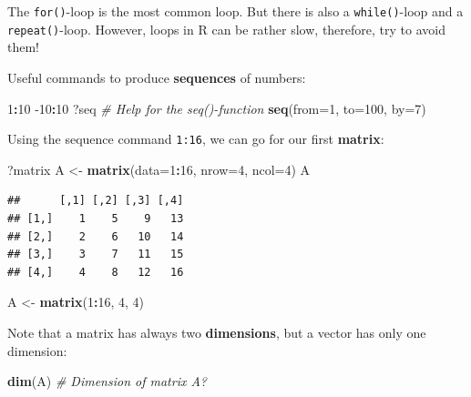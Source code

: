 \documentclass[]{book}
\newenvironment{Shaded}{\begin{snugshade}}{\end{snugshade}}
\newcommand{\CommentTok}[1]{\textcolor[rgb]{0.56,0.35,0.01}{\textit{#1}}}
\newcommand{\DataTypeTok}[1]{\textcolor[rgb]{0.13,0.29,0.53}{#1}}
\newcommand{\DecValTok}[1]{\textcolor[rgb]{0.00,0.00,0.81}{#1}}
\newcommand{\KeywordTok}[1]{\textcolor[rgb]{0.13,0.29,0.53}{\textbf{#1}}}
\newcommand{\NormalTok}[1]{#1}
\newcommand{\OperatorTok}[1]{\textcolor[rgb]{0.81,0.36,0.00}{\textbf{#1}}}
\newcommand{\StringTok}[1]{\textcolor[rgb]{0.31,0.60,0.02}{#1}}
\theoremstyle{definition}
\theoremstyle{definition}
\theoremstyle{definition}
\theoremstyle{remark}
\begin{document}
The \texttt{for()}-loop is the most common loop. But there is also a \texttt{while()}-loop and a \texttt{repeat()}-loop. However, loops in R can be rather slow, therefore, try to avoid them!

Useful commands to produce \textbf{sequences} of numbers:

\begin{Shaded}
\begin{Highlighting}[]
\DecValTok{1}\OperatorTok{:}\DecValTok{10}
\DecValTok{-10}\OperatorTok{:}\DecValTok{10}
\NormalTok{?seq }\CommentTok{# Help for the seq()-function}
\KeywordTok{seq}\NormalTok{(}\DataTypeTok{from=}\DecValTok{1}\NormalTok{, }\DataTypeTok{to=}\DecValTok{100}\NormalTok{, }\DataTypeTok{by=}\DecValTok{7}\NormalTok{)}
\end{Highlighting}
\end{Shaded}

Using the sequence command \texttt{1:16}, we can go for our first \textbf{matrix}:

\begin{Shaded}
\begin{Highlighting}[]
\NormalTok{?matrix}
\NormalTok{A <-}\StringTok{ }\KeywordTok{matrix}\NormalTok{(}\DataTypeTok{data=}\DecValTok{1}\OperatorTok{:}\DecValTok{16}\NormalTok{, }\DataTypeTok{nrow=}\DecValTok{4}\NormalTok{, }\DataTypeTok{ncol=}\DecValTok{4}\NormalTok{)}
\NormalTok{A}
\end{Highlighting}
\end{Shaded}

\begin{verbatim}
##      [,1] [,2] [,3] [,4]
## [1,]    1    5    9   13
## [2,]    2    6   10   14
## [3,]    3    7   11   15
## [4,]    4    8   12   16
\end{verbatim}

\begin{Shaded}
\begin{Highlighting}[]
\NormalTok{A <-}\StringTok{ }\KeywordTok{matrix}\NormalTok{(}\DecValTok{1}\OperatorTok{:}\DecValTok{16}\NormalTok{, }\DecValTok{4}\NormalTok{, }\DecValTok{4}\NormalTok{)}
\end{Highlighting}
\end{Shaded}

Note that a matrix has always two \textbf{dimensions}, but a vector has only one dimension:

\begin{Shaded}
\begin{Highlighting}[]
\KeywordTok{dim}\NormalTok{(A)    }\CommentTok{# Dimension of matrix A?}
\end{Highlighting}
\end{Shaded}
\end{document}
